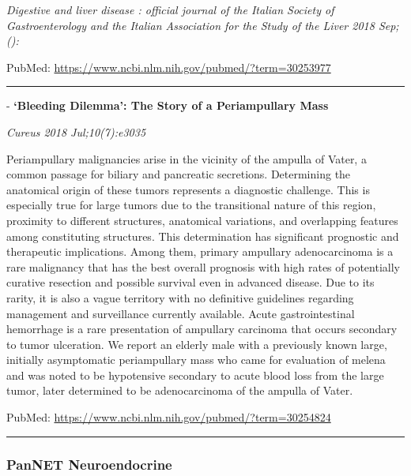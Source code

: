 \documentclass[]{article}
\begin{document}
\emph{Digestive and liver disease : official journal of the Italian
Society of Gastroenterology and the Italian Association for the Study of
the Liver 2018 Sep;():}

PubMed: \url{https://www.ncbi.nlm.nih.gov/pubmed/?term=30253977}

{}

{}

\begin{center}\rule{0.5\linewidth}{\linethickness}\end{center}

 - \textbf{`Bleeding Dilemma': The Story of a Periampullary Mass}

\emph{Cureus 2018 Jul;10(7):e3035}

Periampullary malignancies arise in the vicinity of the ampulla of
Vater, a common passage for biliary and pancreatic secretions.
Determining the anatomical origin of these tumors represents a
diagnostic challenge. This is especially true for large tumors due to
the transitional nature of this region, proximity to different
structures, anatomical variations, and overlapping features among
constituting structures. This determination has significant prognostic
and therapeutic implications. Among them, primary ampullary
adenocarcinoma is a rare malignancy that has the best overall prognosis
with high rates of potentially curative resection and possible survival
even in advanced disease. Due to its rarity, it is also a vague
territory with no definitive guidelines regarding management and
surveillance currently available. Acute gastrointestinal hemorrhage is a
rare presentation of ampullary carcinoma that occurs secondary to tumor
ulceration. We report an elderly male with a previously known large,
initially asymptomatic periampullary mass who came for evaluation of
melena and was noted to be hypotensive secondary to acute blood loss
from the large tumor, later determined to be adenocarcinoma of the
ampulla of Vater.

PubMed: \url{https://www.ncbi.nlm.nih.gov/pubmed/?term=30254824}

{}

{}

\begin{center}\rule{0.5\linewidth}{\linethickness}\end{center}

\hypertarget{pannet-neuroendocrine-3}{%
\subsubsection{PanNET Neuroendocrine}\label{pannet-neuroendocrine-3}}
\end{document}
